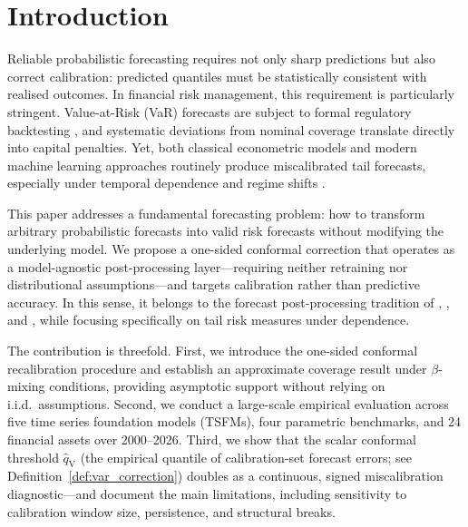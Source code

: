 \documentclass[preprint,11pt,authoryear]{elsarticle}
\newcommand{\1}{\boldsymbol{1}}
\newcommand{\qV}{\hat{q}_{\scriptscriptstyle\mathrm{V}}}
\begin{document}
	\section{Introduction}
	\label{sec:intro}
	
	Reliable probabilistic forecasting requires not only sharp
	predictions but also correct calibration: predicted quantiles
	must be statistically consistent with realised outcomes. In
	financial risk management, this requirement is particularly
	stringent. Value-at-Risk (VaR) forecasts are subject to formal
	regulatory backtesting \citep{basel1996}, and systematic
	deviations from nominal coverage translate directly into
	capital penalties. Yet, both classical econometric models and
	modern machine learning approaches routinely produce
	miscalibrated tail forecasts, especially under temporal
	dependence and regime shifts
	\citep{christoffersen1998, nolde2017elicitability,
		goel2024tsfmvar, pele2025llmvar}.
	
	This paper addresses a fundamental forecasting problem: how to
	transform arbitrary probabilistic forecasts into valid risk
	forecasts without modifying the underlying model. We propose a
	one-sided conformal correction that operates as a model-agnostic
	post-processing layer---requiring neither retraining nor
	distributional assumptions---and targets calibration rather than
	predictive accuracy. In this sense, it belongs to the forecast
	post-processing tradition of \citet{gneiting2013combining},
	\citet{brehmer2021properification}, and
	\citet{taillardat2016calibrated}, while focusing specifically
	on tail risk measures under dependence.
	
	The contribution is threefold. First, we introduce the one-sided
	conformal recalibration procedure and establish an approximate
	coverage result under $\beta$-mixing conditions, providing
	asymptotic support without relying on i.i.d.\ assumptions.
	Second, we conduct a large-scale empirical evaluation across
	five time series foundation models (TSFMs), four parametric
	benchmarks, and 24 financial assets over 2000--2026. Third, we
	show that the scalar conformal threshold $\qV$ (the empirical
	quantile of calibration-set forecast errors; see
	Definition~\ref{def:var_correction}) doubles as a continuous,
	signed miscalibration diagnostic---and document the main limitations, including
	sensitivity to calibration window size, persistence, and
	structural breaks.
	
	
\end{document}
